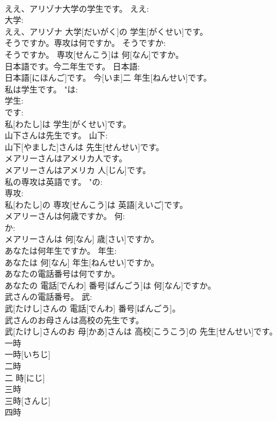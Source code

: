 \documentclass[8pt]{extreport}
\begin{document}
\begin{CJK}{UTF8}{min}
\\	ええ、アリゾナ大学の学生です。	ええ: 
\\	大学: 
\\	ええ、アリゾナ 大学[だいがく]の 学生[がくせい]です。	
\\	そうですか。専攻は何ですか。	そうですか: 
\\	そうですか。 専攻[せんこう]は 何[なん]ですか。	
\\	日本語です。今二年生です。	日本語: 
\\	日本語[にほんご]です。 今[いま]二 年生[ねんせい]です。	
\\	私は学生です。	"は: 
\\	学生: 
\\	です: 
\\	私[わたし]は 学生[がくせい]です。	
\\	山下さんは先生です。	山下: 
\\	山下[やました]さんは 先生[せんせい]です。	
\\	メアリーさんはアメリカ人です。	
\\	メアリーさんはアメリカ 人[じん]です。	
\\	私の専攻は英語です。	"の: 
\\	専攻: 
\\	私[わたし]の 専攻[せんこう]は 英語[えいご]です。	
\\	メアリーさんは何歳ですか。	何: 
\\	か: 
\\	メアリーさんは 何[なん] 歳[さい]ですか。	
\\	あなたは何年生ですか。	年生: 
\\	あなたは 何[なん] 年生[ねんせい]ですか。	
\\	あなたの電話番号は何ですか。	
\\	あなたの 電話[でんわ] 番号[ばんごう]は 何[なん]ですか。	
\\	武さんの電話番号。	武: 
\\	武[たけし]さんの 電話[でんわ] 番号[ばんごう]。	
\\	武さんのお母さんは高校の先生です。	
\\	武[たけし]さんのお 母[かあ]さんは 高校[こうこう]の 先生[せんせい]です。	
\\	一時	
\\	一時[いちじ]		
\\	二時	
\\	二 時[にじ]		
\\	三時	
\\	三時[さんじ]		
\\	四時	

\end{CJK}
\end{document}
